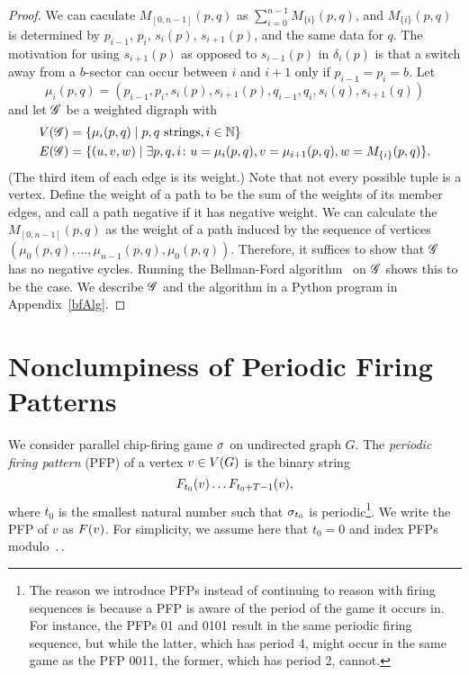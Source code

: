\begin{proof}
We can caculate $M_{[0,n-1]}(p,q)$ as $\sum_{i=0}^{n-1}M_{\{i\}}(p,q)$, and
$M_{\{i\}}(p,q)$ is determined by $p_{i-1}$, $p_i$, $s_i(p)$, $s_{i+1}(p)$, and
the same data for $q$. The motivation for using $s_{i+1}(p)$ as opposed to
$s_{i-1}(p)$ in $\delta_i(p)$ is that a switch away from a $b$-sector can occur
between $i$ and $i+1$ only if $p_{i-1} = p_i = b$. Let
\[
  \mu_i(p,q) = (p_{i-1},p_i,s_i(p),s_{i+1}(p),q_{i-1},q_i,s_i(q),s_{i+1}(q))
\]
and let $\mathscr{G}$ be a weighted digraph with
\begin{align*}
  \V[\G] &= \set{\mu_i(p,q)}{p,q \text{ strings}, i \in \nats} \\
  \E[\G] &= \set{(u,v,w)}{\exists p,q,i\colon
    u = \mu_i(p,q),
    v = \mu_{i+1}(p,q),
    w = M_{\{i\}}(p,q)}.
\end{align*}
(The third item of each edge is its weight.) Note that not every possible tuple
is a vertex. Define the weight of a path to be the sum of the weights of its
member edges, and call a path negative if it has negative weight. We can
calculate the $M_{[0,n-1]}(p,q)$ as the weight of a path induced by the
sequence of vertices $(\mu_0(p,q), \dots, \mu_{n-1}(p,q),
\mu_0(p,q))$. Therefore, it suffices to show that $\mathscr{G}$ has no negative
cycles. Running the Bellman-Ford algorithm~\cite{bellmanford} on $\mathscr{G}$ shows
this to be the case. We describe $\mathscr{G}$ and the algorithm in a Python program in
Appendix~\ref{bfAlg}.
\end{proof}

\section{Nonclumpiness of Periodic Firing Patterns}\label{nonclumpiness}
We consider parallel chip-firing game $\sigma$ on undirected graph $G$. The
\emph{periodic firing pattern} (PFP) of a vertex $v \in V(G)$ is the binary
string
\[
  \firing{v}{t_0}\dots\firing{v}{t_0 + \period - 1},
\]
where $t_0$ is the smallest natural number such that $\sigma_{t_0}$ is
periodic\footnote{The reason we introduce PFPs instead of continuing to reason
  with firing sequences is because a PFP is aware of the period of the game it
  occurs in. For instance, the PFPs 01 and 0101 result in the same periodic
  firing sequence, but while the latter, which has period 4, might occur in the
  same game as the PFP 0011, the former, which has period 2, cannot.}. We write
the PFP of $v$ as $\pfp{v}$. For simplicity, we assume here that $t_0 = 0$ and
index PFPs modulo $\period$.

